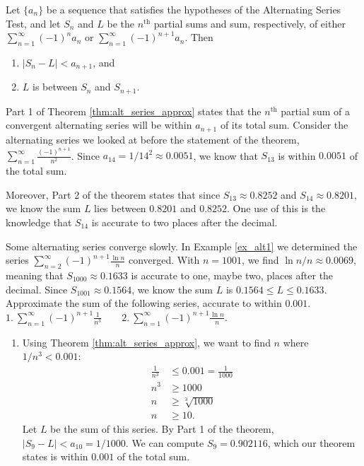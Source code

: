 \documentclass[10pt]{article}
\newcommand{\ds}{\displaystyle}
\begin{document}
{Let $\{a_n\}$ be a sequence that satisfies the hypotheses of the Alternating Series Test, and let $S_n$ and $L$ be the $n^\text{th}$ partial sums and sum, respectively, of either $\ds \sum_{n=1}^\infty (-1)^{n}a_n$ or $\ds \sum_{n=1}^\infty (-1)^{n+1}a_n$. Then
\begin{enumerate}
	\item $|S_n-L| < a_{n+1}$, and
	\item	$L$ is between $S_n$ and $S_{n+1}$.
\end{enumerate}

Part 1 of Theorem \ref{thm:alt_series_approx} states that the $n^\text{th}$ partial sum of a convergent alternating series will be within $a_{n+1}$ of its total sum. Consider the alternating series we looked at before the statement of the theorem, $\ds \sum_{n=1}^\infty \frac{(-1)^{n+1}}{n^2}$. Since $a_{14} = 1/14^2 \approx 0.0051$, we know that $S_{13}$ is within $0.0051$ of the total sum. 

Moreover, Part 2 of the theorem states that since $S_{13} \approx 0.8252$ and $S_{14}\approx 0.8201$, we know the sum $L$ lies between $0.8201$ and $0.8252$. One use of this is the knowledge that $S_{14}$ is accurate to two places after the decimal.

Some alternating series converge slowly. In Example \ref{ex_alt1} we determined the series $\ds\sum_{n=2}^\infty (-1)^{n+1}\frac{\ln n}{n}$ converged. With $n=1001$, we find $\ln n/n \approx 0.0069$, meaning that $S_{1000} \approx 0.1633$ is accurate to one, maybe two, places after the decimal. Since $S_{1001} \approx 0.1564$, we know the sum $L$ is $0.1564\leq L\leq0.1633$.\\

{
Approximate the sum of the following series, accurate to within $0.001$.\\

\noindent$\ds 1.\ \sum_{n=1}^\infty (-1)^{n+1}\frac{1}{n^3}\qquad 2.\ \sum_{n=1}^\infty (-1)^{n+1}\frac{\ln n}{n}$.
}
{\begin{enumerate}
	\item  Using Theorem \ref{thm:alt_series_approx}, we want to find $n$ where $1/n^3 < 0.001$:
	\begin{align*}
	\frac1{n^3} &\leq 0.001=\frac{1}{1000} \\
	n^3 &\geq 1000\\
	n &\geq \sqrt[3]{1000}\\
	n &\geq 10.
	\end{align*}
	Let $L$ be the sum of this series. By Part 1 of the theorem, $|S_9-L|<a_{10} = 1/1000$. We can compute $S_9=0.902116$, which our theorem states is within $0.001$ of the total sum. 
	

\end{enumerate}}}
\end{document}
